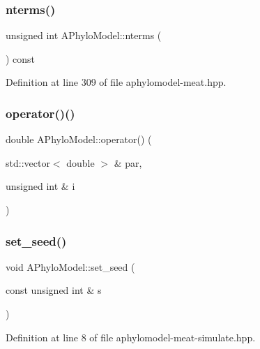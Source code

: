 \subsubsection{\texorpdfstring{nterms()}{nterms()}}
{\footnotesize\ttfamily unsigned int A\+Phylo\+Model\+::nterms (\begin{DoxyParamCaption}{ }\end{DoxyParamCaption}) const}



Definition at line 309 of file aphylomodel-\/meat.\+hpp.

\mbox{\label{class_a_phylo_model_a9b3390c29ea7a3283e68e9a059b94138}} 
\subsubsection{\texorpdfstring{operator()()}{operator()()}}
{\footnotesize\ttfamily double A\+Phylo\+Model\+::operator() (\begin{DoxyParamCaption}\item[{std\+::vector$<$ double $>$ \&}]{par,  }\item[{unsigned int \&}]{i }\end{DoxyParamCaption})}

\mbox{\label{class_a_phylo_model_a5f3faed4bad372764c056d1686508d6e}} 
\subsubsection{\texorpdfstring{set\+\_\+seed()}{set\_seed()}}
{\footnotesize\ttfamily void A\+Phylo\+Model\+::set\+\_\+seed (\begin{DoxyParamCaption}\item[{const unsigned int \&}]{s }\end{DoxyParamCaption})}



Definition at line 8 of file aphylomodel-\/meat-\/simulate.\+hpp.

\mbox{\label{class_a_phylo_model_ac75bb5a2f14d104733e2c194ae210986}} 
